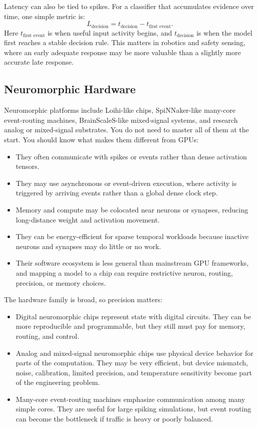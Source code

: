Latency can also be tied to spikes. For a classifier that accumulates evidence over time, one simple metric is:
\[
  L_{\text{decision}} = t_{\text{decision}} - t_{\text{first event}}.
\]
Here \(t_{\text{first event}}\) is when useful input activity begins, and \(t_{\text{decision}}\) is when the model first reaches a stable decision rule. This matters in robotics and safety sensing, where an early adequate response may be more valuable than a slightly more accurate late response.

\subsection{Neuromorphic Hardware}

Neuromorphic platforms include Loihi-like chips, SpiNNaker-like many-core event-routing machines, BrainScaleS-like mixed-signal systems, and research analog or mixed-signal substrates. You do not need to master all of them at the start. You should know what makes them different from GPUs:

\begin{itemize}[leftmargin=*]
  \item They often communicate with spikes or events rather than dense activation tensors.
  \item They may use asynchronous or event-driven execution, where activity is triggered by arriving events rather than a global dense clock step.
  \item Memory and compute may be colocated near neurons or synapses, reducing long-distance weight and activation movement.
  \item They can be energy-efficient for sparse temporal workloads because inactive neurons and synapses may do little or no work.
  \item Their software ecosystem is less general than mainstream GPU frameworks, and mapping a model to a chip can require restrictive neuron, routing, precision, or memory choices.
\end{itemize}

The hardware family is broad, so precision matters:

\begin{itemize}[leftmargin=*]
  \item Digital neuromorphic chips represent state with digital circuits. They can be more reproducible and programmable, but they still must pay for memory, routing, and control.
  \item Analog and mixed-signal neuromorphic chips use physical device behavior for parts of the computation. They may be very efficient, but device mismatch, noise, calibration, limited precision, and temperature sensitivity become part of the engineering problem.
  \item Many-core event-routing machines emphasize communication among many simple cores. They are useful for large spiking simulations, but event routing can become the bottleneck if traffic is heavy or poorly balanced.
\end{itemize}

